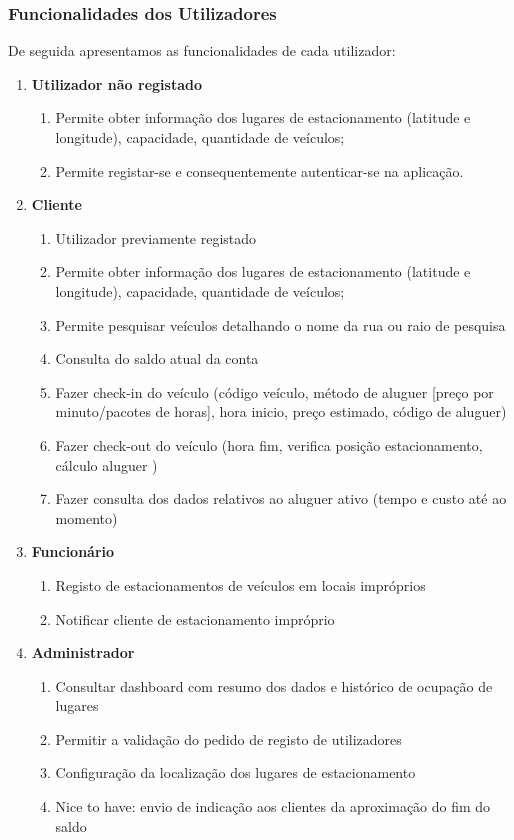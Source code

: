 \documentclass[11pt]{report}
\begin{document}
\subsubsection*{Funcionalidades dos Utilizadores}
De seguida apresentamos as funcionalidades de cada utilizador:

\begin{enumerate}
\item \textbf{Utilizador não registado}

\begin{enumerate}
\item Permite obter informação dos lugares de estacionamento (latitude e longitude), capacidade, quantidade de veículos;
\item Permite registar-se e consequentemente autenticar-se na aplicação.

\end{enumerate}
\bigskip
\item  \textbf{Cliente}


\begin{enumerate}
\item Utilizador previamente registado
\item Permite obter informação dos lugares de estacionamento (latitude e longitude), capacidade, quantidade de veículos;
\item Permite pesquisar veículos detalhando o nome da rua ou raio de pesquisa
\item Consulta do saldo atual da conta
\item Fazer check-in do veículo (código veículo, método de aluguer [preço por minuto/pacotes de horas], hora inicio, preço estimado, código de aluguer)
\item  Fazer check-out do veículo (hora fim, verifica posição estacionamento, cálculo aluguer )
\item Fazer consulta dos dados relativos ao aluguer ativo (tempo e custo até ao momento)
\end{enumerate}
\bigskip
\item \textbf{Funcionário}
\begin{enumerate}
\item Registo de estacionamentos de veículos em locais impróprios
\item  Notificar cliente de estacionamento impróprio
\end{enumerate}
\clearpage
\item \textbf{Administrador}

\begin{enumerate}
\item Consultar dashboard com resumo dos dados e histórico de ocupação de lugares
\item  Permitir a validação do pedido de registo de utilizadores
\item Configuração da localização dos lugares de estacionamento
\item Nice to have: envio de indicação aos clientes da aproximação do fim do saldo
\end{enumerate}

\end{enumerate}
\end{document}
